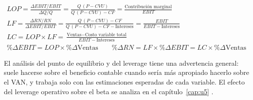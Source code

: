 \begin{formulaBox}
\[
\begin{gathered}
LOP = \frac{\Delta EBIT/EBIT}{\Delta Q/Q} = \frac{Q\,(P - CVU)}{Q\,(P - CVU) - CF} = \frac{\text{Contribución marginal}}{EBIT}
\\[4pt]
LF = \frac{\Delta RN/RN}{\Delta EBIT/EBIT} = \frac{Q\,(P - CVU) - CF}{Q\,(P - CVU) - CF - \text{Intereses}} = \frac{EBIT}{EBIT - \text{Intereses}}
\\[4pt]
LC = LOP\times LF = \frac{\text{Ventas} - \text{Costo variable total}}{EBIT - \text{Intereses}}
\\[4pt]
\%\Delta EBIT = LOP\times\%\Delta\text{Ventas}
\qquad
\%\Delta RN = LF\times\%\Delta EBIT = LC\times\%\Delta\text{Ventas}
\end{gathered}
\]
\end{formulaBox}

El análisis del punto de equilibrio y del leverage tiene una advertencia general: suele hacerse sobre el beneficio contable cuando sería más apropiado hacerlo sobre el VAN, y trabaja solo con las estimaciones esperadas de cada variable. El efecto del leverage operativo sobre el beta se analiza en el capítulo~\ref{cap:u5} .

